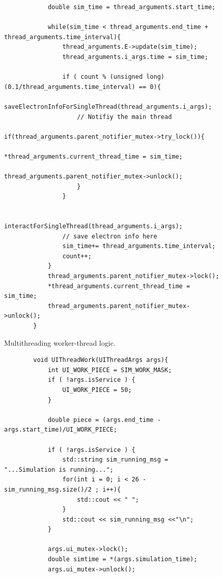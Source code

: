 \documentclass[a4paper,oneside,12pt]{report}
\numberwithin{equation}{chapter}
\begin{document}
{\begin{figure}[H]
\begin{verbatim}
            double sim_time = thread_arguments.start_time;
        
            while(sim_time < thread_arguments.end_time + thread_arguments.time_interval){
                thread_arguments.E->update(sim_time);
                thread_arguments.i_args.time = sim_time;
                
                if ( count % (unsigned long)(0.1/thread_arguments.time_interval) == 0){
                    saveElectronInfoForSingleThread(thread_arguments.i_args);
                    // Notifiy the main thread
                    if(thread_arguments.parent_notifier_mutex->try_lock()){
                        *thread_arguments.current_thread_time = sim_time;
                        thread_arguments.parent_notifier_mutex->unlock();
                    }
                }
        
                interactForSingleThread(thread_arguments.i_args);
                // save electron info here
                sim_time+= thread_arguments.time_interval;
                count++;
            }
            thread_arguments.parent_notifier_mutex->lock();
            *thread_arguments.current_thread_time = sim_time;
            thread_arguments.parent_notifier_mutex->unlock();
        }
    \end{verbatim}
    \vspace{20pt}
    \caption{Multithreading worker-thread logic.}
    \label{fig:threadLoop}
\end{figure}

\begin{figure}[H]
    \centering
    \begin{verbatim}
        void UIThreadWork(UIThreadArgs args){
            int UI_WORK_PIECE = SIM_WORK_MASK;
            if ( !args.isService ) {
                UI_WORK_PIECE = 50;
            }
        
            double piece = (args.end_time - args.start_time)/UI_WORK_PIECE;
        
            if ( !args.isService ) {
                std::string sim_running_msg = "...Simulation is running...";
                for(int i = 0; i < 26 - sim_running_msg.size()/2 ; i++){
                    std::cout << " ";
                }
                std::cout << sim_running_msg <<"\n";
            }
        
            args.ui_mutex->lock();
            double simtime = *(args.simulation_time);
            args.ui_mutex->unlock();
        

\end{verbatim}
\end{figure}}
\end{document}
